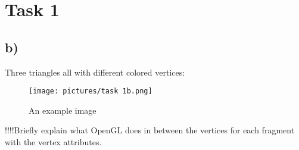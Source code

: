 \section{Task 1}
\subsection{b)}
Three triangles all with different colored vertices:
\begin{figure}[h!]
    \centering
    \texttt{[image: pictures/task 1b.png]}
    \caption{An example image}
    \label{fig:example_image}
\end{figure}

!!!!Briefly explain what OpenGL does in between the vertices for each fragment with the vertex attributes.
